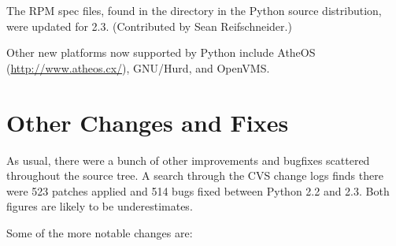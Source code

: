 \documentclass{howto}
\begin{document}
The RPM spec files, found in the  directory in the
Python source distribution, were updated for 2.3.  (Contributed by
Sean Reifschneider.)

Other new platforms now supported by Python include AtheOS
(\url{http://www.atheos.cx/}), GNU/Hurd, and OpenVMS.


\section{Other Changes and Fixes \label{section-other}}

As usual, there were a bunch of other improvements and bugfixes
scattered throughout the source tree.  A search through the CVS change
logs finds there were 523 patches applied and 514 bugs fixed between
Python 2.2 and 2.3.  Both figures are likely to be underestimates.

Some of the more notable changes are:
\end{document}
